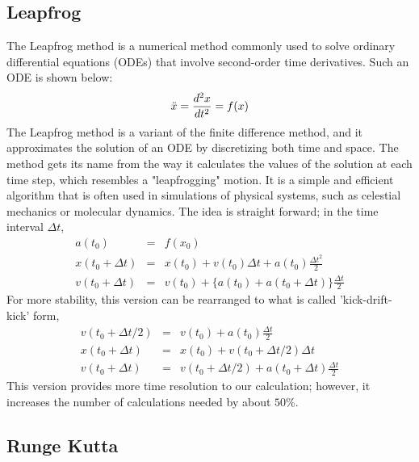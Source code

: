\documentclass{article}
\begin{document}
\subsection{Leapfrog} \label{sec:leapfrog}
The Leapfrog method is a numerical method commonly used to solve ordinary differential equations (ODEs) that involve second-order time derivatives. Such an ODE is shown below:
\begin{equation}
    \ddot{x} = \frac{d^2 x}{dt^2} = f(x) \label{eq:second-order-ODE}
\end{equation}
\newline
The Leapfrog method is a variant of the finite difference method, and it approximates the solution of an ODE by discretizing both time and space. The method gets its name from the way it calculates the values of the solution at each time step, which resembles a "leapfrogging" motion. 
It is a simple and efficient algorithm that is often used in simulations of physical systems, such as celestial mechanics or molecular dynamics.
The idea is straight forward; in the time interval $\Delta t$, 
\begin{eqnarray}
    a(t_0) &=& f(x_0) \nonumber \\
    x(t_0 + \Delta t) &=& x(t_0) + v(t_0)\Delta t + a(t_0)\frac{\Delta t^2}{2} \label{eq:leapfrog_sync_x}\\
    v(t_0 + \Delta t) &=& v(t_0) + \{ a(t_0) + a(t_0 + \Delta t)\}\frac{\Delta t}{2}  \label{eq:leapfrog_sync_v}
\end{eqnarray}
For more stability, this version can be rearranged to what is called 'kick-drift-kick' form,
\begin{eqnarray} \label{eq:leapfrog}
    v(t_0 + \Delta t/2) &=& v(t_0) +  a(t_0)\frac{\Delta t}{2} \nonumber \\
    x(t_0 + \Delta t) &=& x(t_0) + v(t_0 + \Delta t/2)\Delta t \\
    v(t_0 + \Delta t) &=& v(t_0 + \Delta t/2) + a(t_0 + \Delta t)\frac{\Delta t}{2}  \nonumber
\end{eqnarray}
This version provides more time resolution to our calculation; however, it increases the number of calculations needed by about $50\%$.

\subsection{Runge Kutta} \label{sec:rungekutta}
\end{document}
